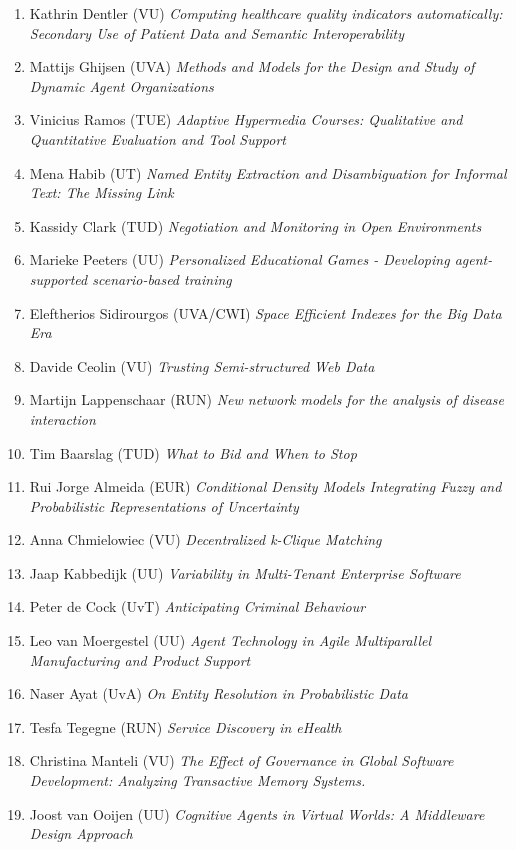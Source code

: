 \begin{multicols}{2}
\begin{scriptsize}
\begin{enumerate}[leftmargin=*,noitemsep,topsep=0pt,parsep=1pt,partopsep=0pt]
{}\item Kathrin Dentler (VU) \textit{Computing healthcare quality indicators automatically: Secondary Use of Patient Data and Semantic Interoperability
}\item Mattijs Ghijsen (UVA) \textit{Methods and Models for the Design and Study of Dynamic Agent Organizations
}\item Vinicius Ramos (TUE) \textit{Adaptive Hypermedia Courses: Qualitative and Quantitative Evaluation and Tool Support 
}\item Mena Habib (UT) \textit{Named Entity Extraction and Disambiguation for Informal Text: The Missing Link
}\item Kassidy Clark (TUD) \textit{Negotiation and Monitoring in Open Environments 
}\item Marieke Peeters (UU) \textit{Personalized Educational Games - Developing agent-supported scenario-based training
}\item Eleftherios Sidirourgos (UVA/CWI) \textit{Space Efficient Indexes for the Big Data Era 
}\item Davide Ceolin (VU) \textit{Trusting Semi-structured Web Data
}\item Martijn Lappenschaar (RUN) \textit{New network models for the analysis of disease interaction 
}\item Tim Baarslag (TUD) \textit{What to Bid and When to Stop
}\item Rui Jorge Almeida (EUR) \textit{Conditional Density Models Integrating Fuzzy and Probabilistic Representations of Uncertainty 
}\item Anna Chmielowiec (VU) \textit{Decentralized k-Clique Matching
}\item Jaap Kabbedijk (UU) \textit{Variability in Multi-Tenant Enterprise Software
}\item Peter de Cock (UvT) \textit{Anticipating Criminal Behaviour
}\item Leo van Moergestel (UU) \textit{Agent Technology in Agile Multiparallel Manufacturing and Product Support
}\item Naser Ayat (UvA) \textit{On Entity Resolution in Probabilistic Data
}\item Tesfa Tegegne (RUN) \textit{Service Discovery in eHealth
}\item Christina Manteli (VU) \textit{The Effect of Governance in Global Software Development: Analyzing Transactive Memory Systems.
}\item Joost van Ooijen (UU) \textit{Cognitive Agents in Virtual Worlds: A Middleware Design Approach
}
\end{enumerate}
\end{scriptsize}
\end{multicols}
